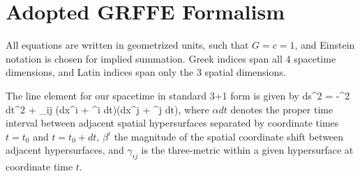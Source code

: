 \section{Adopted GRFFE Formalism}
\label{formalism}

All equations are written in geometrized units, such that
$G=c=1$, and Einstein notation is chosen for implied summation. Greek
indices span all 4 spacetime dimensions, and Latin indices span only
the 3 spatial dimensions.

The line element for our spacetime in standard 3+1 form is given by
\beq
ds^2 = -\alpha^2 dt^2 + \gamma_{ij} (dx^i + \beta^i dt)(dx^j + \beta^j dt),
\eeq
where $\alpha dt$ denotes the proper time interval between adjacent
spatial hypersurfaces separated by coordinate times $t=t_0$ and
$t=t_0+dt$, $\beta^i$ the magnitude of the spatial coordinate shift between adjacent
hypersurfaces, and $\gamma_{ij}$ is the three-metric within a given
hypersurface at coordinate time $t$.

